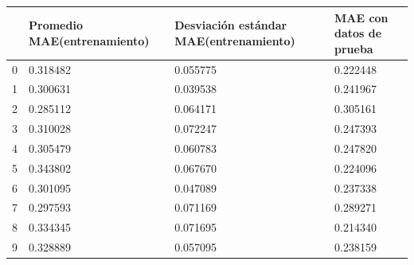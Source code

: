 \begin{tabular}{llll}
\toprule
 & Promedio MAE(entrenamiento) & Desviación estándar MAE(entrenamiento) & MAE con datos de prueba \\
\midrule
0 & 0.318482 & 0.055775 & 0.222448 \\
1 & 0.300631 & 0.039538 & 0.241967 \\
2 & 0.285112 & 0.064171 & 0.305161 \\
3 & 0.310028 & 0.072247 & 0.247393 \\
4 & 0.305479 & 0.060783 & 0.247820 \\
5 & 0.343802 & 0.067670 & 0.224096 \\
6 & 0.301095 & 0.047089 & 0.237338 \\
7 & 0.297593 & 0.071169 & 0.289271 \\
8 & 0.334345 & 0.071695 & 0.214340 \\
9 & 0.328889 & 0.057095 & 0.238159 \\
\bottomrule
\end{tabular}
